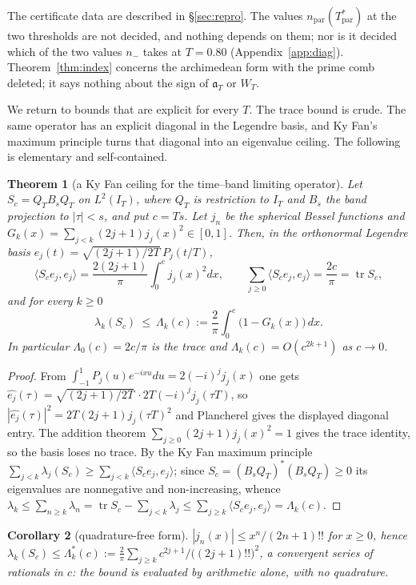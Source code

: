 \documentclass[11pt]{amsart}
\newtheorem{theorem}{Theorem}[section]
\newtheorem{corollary}[theorem]{Corollary}
\theoremstyle{definition}
\theoremstyle{remark}
\newcommand{\IT}{I_T}
\begin{document}
The certificate data are described in \S\ref{sec:repro}. The values $n_{\mathrm{par}}(T^*_{\mathrm{par}})$
at the two thresholds are not decided, and nothing depends on them; nor is it decided which of the two
values $n_-$ takes at $T=0.80$ (Appendix~\ref{app:diag}). Theorem~\ref{thm:index} concerns the
archimedean form with the prime comb deleted; it says nothing about the sign of $\mathfrak a_T$ or
$W_T$.

We return to bounds that are explicit for every $T$. The trace bound is crude. The same operator has
an explicit diagonal in the Legendre basis, and Ky Fan's maximum principle turns that diagonal into
an eigenvalue ceiling. The following is elementary and self-contained.

\begin{theorem}[a Ky Fan ceiling for the time--band limiting operator]\label{thm:P}
Let $S_c=Q_TB_sQ_T$ on $L^2(\IT)$, where $Q_T$ is restriction to $\IT$ and $B_s$ the band projection
to $|\tau|<s$, and put $c=Ts$. Let $j_n$ be the spherical Bessel functions and
$G_k(x)=\sum_{j<k}(2j+1)j_j(x)^2\in[0,1]$. Then, in the orthonormal Legendre basis
$e_j(t)=\sqrt{(2j+1)/2T}\,P_j(t/T)$,
\[
\langle S_ce_j,e_j\rangle=\frac{2(2j+1)}\pi\int_0^cj_j(x)^2dx,\qquad
\sum_{j\ge0}\langle S_ce_j,e_j\rangle=\frac{2c}\pi=\operatorname{tr}S_c ,
\]
and for every $k\ge0$
\[
\lambda_k(S_c)\ \le\ \Lambda_k(c):=\frac2\pi\int_0^c\big(1-G_k(x)\big)\,dx .
\]
In particular $\Lambda_0(c)=2c/\pi$ is the trace and $\Lambda_k(c)=O(c^{2k+1})$ as $c\to0$.
\end{theorem}
\begin{proof}
From $\int_{-1}^1P_j(u)e^{-ixu}du=2(-i)^jj_j(x)$ one gets
$\widehat{e_j}(\tau)=\sqrt{(2j+1)/2T}\,\cdot2T(-i)^jj_j(\tau T)$, so
$|\widehat{e_j}(\tau)|^2=2T(2j+1)j_j(\tau T)^2$ and Plancherel gives the displayed diagonal entry.
The addition theorem $\sum_{j\ge0}(2j+1)j_j(x)^2=1$ gives the trace identity, so the basis loses no
trace. By the Ky Fan maximum principle $\sum_{j<k}\lambda_j(S_c)\ge\sum_{j<k}\langle
S_ce_j,e_j\rangle$; since $S_c=(B_sQ_T)^*(B_sQ_T)\ge0$ its eigenvalues are nonnegative and
non-increasing, whence
$\lambda_k\le\sum_{n\ge k}\lambda_n=\operatorname{tr}S_c-\sum_{j<k}\lambda_j\le\sum_{j\ge k}\langle
S_ce_j,e_j\rangle=\Lambda_k(c)$.
\end{proof}

\begin{corollary}[quadrature-free form]\label{cor:P1}
$|j_n(x)|\le x^n/(2n+1)!!$ for $x\ge0$, hence
$\lambda_k(S_c)\le\Lambda^*_k(c):=\frac2\pi\sum_{j\ge k}c^{2j+1}/\big((2j+1)!!\big)^2$, a convergent
series of rationals in $c$: the bound is evaluated by arithmetic alone, with no quadrature.
\end{corollary}
\end{document}
